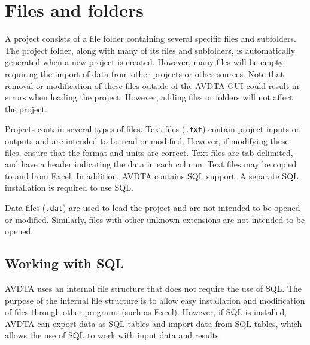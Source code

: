 \section{Files and folders}

A project consists of a file folder containing several specific files and subfolders. The project folder, along with many of its files and subfolders, is automatically generated when a new project is created. However, many files will be empty, requiring the import of data from other projects or other sources. Note that removal or modification of these files outside of the AVDTA GUI could result in errors when loading the project. However, adding files or folders will not affect the project. 

Projects contain several types of files. Text files (\texttt{.txt}) contain project inputs or outputs and are intended to be read or modified. However, if modifying these files, ensure that the format and units are correct. Text files are tab-delimited, and have a header indicating the data in each column. Text files may be copied to and from Excel. In addition, AVDTA contains SQL support. A separate SQL installation is required to use SQL.

Data files (\texttt{.dat}) are used to load the project and are not intended to be opened or modified. Similarly, files with other unknown extensions are not intended to be opened.

\subsection{Working with SQL}
\label{sec:setupsql}
AVDTA uses an internal file structure that does not require the use of SQL. The purpose of the internal file structure is to allow easy installation and modification of files through other programs (such as Excel). However, if SQL is installed, AVDTA can export data as SQL tables and import data from SQL tables, which allows the use of SQL to work with input data and results.

